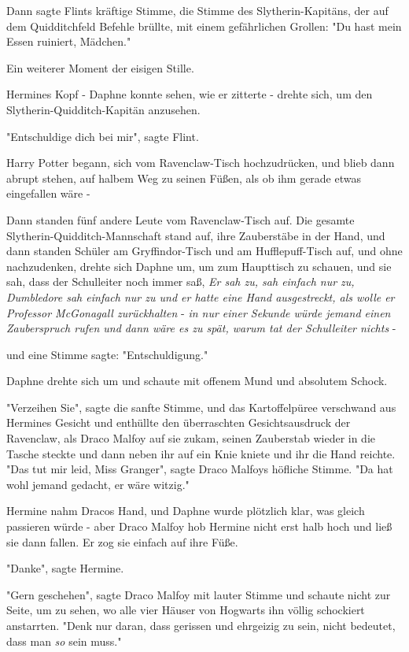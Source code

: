 {Dann sagte Flints kräftige Stimme, die Stimme des Slytherin-Kapitäns, der auf dem Quidditchfeld Befehle brüllte, mit einem gefährlichen Grollen: "Du hast mein Essen ruiniert, Mädchen."

Ein weiterer Moment der eisigen Stille.

Hermines Kopf - Daphne konnte sehen, wie er zitterte - drehte sich, um den Slytherin-Quidditch-Kapitän anzusehen.

"Entschuldige dich bei mir", sagte Flint.

Harry Potter begann, sich vom Ravenclaw-Tisch hochzudrücken, und blieb dann abrupt stehen, auf halbem Weg zu seinen Füßen, als ob ihm gerade etwas eingefallen wäre -

Dann standen fünf andere Leute vom Ravenclaw-Tisch auf. Die gesamte Slytherin-Quidditch-Mannschaft stand auf, ihre Zauberstäbe in der Hand, und dann standen Schüler am Gryffindor-Tisch und am Hufflepuff-Tisch auf, und ohne nachzudenken, drehte sich Daphne um, um zum Haupttisch zu schauen, und sie sah, dass der Schulleiter noch immer saß, \emph{Er sah zu, sah einfach nur zu, Dumbledore sah einfach nur zu und er hatte eine Hand ausgestreckt, als wolle er Professor McGonagall zurückhalten} - \emph{in nur einer Sekunde würde jemand einen Zauberspruch rufen und dann wäre es zu spät, warum tat der Schulleiter nichts} -

und eine Stimme sagte: "Entschuldigung."

Daphne drehte sich um und schaute mit offenem Mund und absolutem Schock.

"Verzeihen Sie", sagte die sanfte Stimme, und das Kartoffelpüree verschwand aus Hermines Gesicht und enthüllte den überraschten Gesichtsausdruck der Ravenclaw, als Draco Malfoy auf sie zukam, seinen Zauberstab wieder in die Tasche steckte und dann neben ihr auf ein Knie kniete und ihr die Hand reichte. "Das tut mir leid, Miss Granger", sagte Draco Malfoys höfliche Stimme. "Da hat wohl jemand gedacht, er wäre witzig."

Hermine nahm Dracos Hand, und Daphne wurde plötzlich klar, was gleich passieren würde - aber Draco Malfoy hob Hermine nicht erst halb hoch und ließ sie dann fallen. Er zog sie einfach auf ihre Füße.

"Danke", sagte Hermine.

"Gern geschehen", sagte Draco Malfoy mit lauter Stimme und schaute nicht zur Seite, um zu sehen, wo alle vier Häuser von Hogwarts ihn völlig schockiert anstarrten. "Denk nur daran, dass gerissen und ehrgeizig zu sein, nicht bedeutet, dass man \emph{so} sein muss."

}
